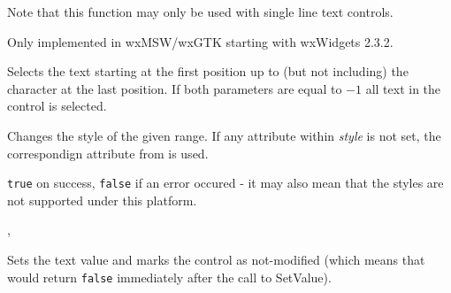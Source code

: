 Note that this function may only be used with single line text controls.


Only implemented in wxMSW/wxGTK starting with wxWidgets 2.3.2.


\label{wxtextctrlsetselection}


Selects the text starting at the first position up to (but not including) the
character at the last position. If both parameters are equal to $-1$ all text
in the control is selected.





\label{wxtextctrlsetstyle}


Changes the style of the given range. If any attribute within {\it style} is
not set, the correspondign attribute from  is used.






{\tt true} on success, {\tt false} if an error occured - it may also mean that
the styles are not supported under this platform.


, 


\label{wxtextctrlsetvalue}


Sets the text value and marks the control as not-modified (which means that 
 would return {\tt false} immediately
after the call to SetValue).

